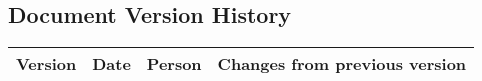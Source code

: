 %

\subsection*{Document Version History}

\begin{table}[h]
  \centering
  \begin{tabularx}{\textwidth}{|c|c|c|X|}
    \hline
    \rowcolor{iob-green}
             {\bf Version} & {\bf Date} & {\bf Person} & {\bf Changes from previous version} \\ \hline
             
  \end{tabularx}
\end{table}
